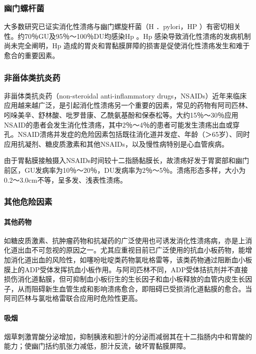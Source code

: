 \subsubsection{幽门螺杆菌}

大多数研究已证实消化性溃疡与幽门螺旋杆菌（{H} ．pylori，{HP}
）有密切相关性。约70％GU及95％～100％DU均感染{Hp} 。{Hp}
感染导致消化性溃疡的发病机制尚未完全阐明，{Hp}
造成的胃炎和胃黏膜屏障的损害是促使消化性溃疡发生和难于愈合的重要因素。

\subsubsection{非甾体类抗炎药}

非甾体类抗炎药（non-steroidal anti-inflammatory
drugs，NSAIDs）近年来临床应用越来越广泛，是引起消化性溃疡另一个重要的因素，常见的药物有阿司匹林、吲哚美辛、舒林酸、吡罗昔康、乙酰氨基酚和保泰松等。大约15％～30％应用NSAID的患者会发生消化性溃疡，其中2％～4％的患者可能发生溃疡出血或穿孔。NSAID溃疡并发症的危险因素包括既往消化道并发症、年龄（＞65岁）、同时应用抗凝剂、糖皮质激素和其他NSAIDs，以及慢性病特别是心血管疾病。

由于胃黏膜接触摄入NSAIDs时间较十二指肠黏膜长，故溃疡好发于胃窦部和幽门前区，GU发病率为10％～20％，DU发病率为2％～5％。溃疡形态多样，大小为0.2～3.0cm不等，呈多发、浅表性溃疡。

\subsubsection{其他危险因素}
\paragraph{其他药物}

如糖皮质激素、抗肿瘤药物和抗凝药的广泛使用也可诱发消化性溃疡病，亦是上消化道出血不可忽视的原因之一。尤其应重视目前已广泛使用的抗血小板药物，能增加消化道出血的风险性，如噻吩吡啶类药物氯吡格雷等，该类药物通过阻断血小板膜上的ADP受体发挥抗血小板作用。与阿司匹林不同，ADP受体拮抗剂并不直接损伤消化道黏膜，但可抑制血小板衍生的生长因子和血小板释放的血管内皮生长因子，从而阻碍新生血管生成和影响溃疡愈合，即阻碍已受损消化道黏膜的愈合。当阿司匹林与氯吡格雷联合应用时危险性更高。
\paragraph{吸烟}

烟草刺激胃酸分泌增加，抑制胰液和胆汁的分泌而减弱其在十二指肠内中和胃酸的能力；使幽门括约肌张力减低，胆汁反流，破坏胃黏膜屏障。
